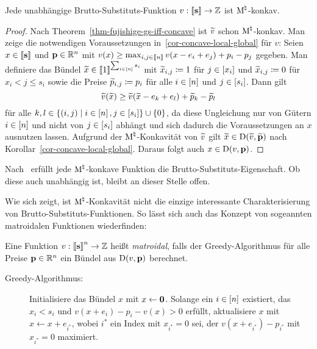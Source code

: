 \begin{korollar}\label{cor-indep-gs-m-concave}
	Jede unabhängige Brutto-Substituts-Funktion $v:\left\llbracket \mathbf{s} \right\rrbracket \rightarrow \mathbb{Z}$ ist $\textrm{\textup{M}}^\natural$-konkav.
\end{korollar}
\begin{proof}
	Nach Theorem~\ref{thm-fujishige-gs-iff-concave} ist $\widetilde{v}$ schon $\textrm{\textup{M}}^\natural$-konkav.
	Man zeige die notwendigen Voraussetzungen in~\ref{cor-concave-local-global} für $v$:
	Seien $x\in\left\llbracket \mathbf{s} \right\rrbracket$ und $\mathbf{p}\in\mathbb{R}^n$ mit $v(x)\geq \max_{i,j\in\left\llbracket n \right\rrbracket} v(x - e_i + e_j) + p_i - p_j$ gegeben.
	Man definiere das Bündel $\widetilde{x}\in\left\llbracket 1 \right\rrbracket^{\sum_{i\in\left[ n \right]} s_i}$ mit $\widetilde{x}_{i,j} \coloneqq 1$ für $j\in\left[ x_i \right]$ und $\widetilde{x}_{i,j} \coloneqq 0$ für $x_i < j \leq s_i$ sowie die Preise $\widetilde{p}_{i,j}\coloneqq p_i$ für alle $i\in\left[ n \right]$ und $j\in\left[ s_i \right]$.
	Dann
	gilt \[
	\widetilde{v}(\widetilde{x}) \geq \widetilde{v}(\widetilde{x} - e_k + e_l) + \widetilde{p}_k - \widetilde{p}_l
	\] für alle $k, l \in \{ (i,j) \mid i\in\left[ n \right], j\in\left[ s_i \right] \}\cup\{ 0 \}$, da diese Ungleichung nur von Gütern $i\in\left[ n \right]$ und nicht von $j\in\left[ s_i \right]$ abhängt und sich dadurch die Voraussetzungen an $x$ ausnutzen lassen.
	Aufgrund der $\textrm{\textup{M}}^\natural$-Konkavität von $\widetilde{v}$ gilt $\widetilde{x}\in\operatorname{D}(\widetilde{v}, \widetilde{\mathbf{p}})$ nach Korollar~\ref{cor-concave-local-global}. Daraus folgt auch $x\in\operatorname{D}(v,\mathbf{p})$.
\end{proof}
\begin{bemerkung}
	Nach~\cite[Theorem~11.4]{Murota2003} erfüllt jede $\textrm{\textup{M}}^\natural$-konkave Funktion die Brutto-Substituts-Eigenschaft.
	Ob diese auch unabhängig ist, bleibt an dieser Stelle offen.
\end{bemerkung}

Wie sich zeigt, ist $\textrm{\textup{M}}^\natural$-Konkavität nicht die einzige interessante Charakterisierung von Brutto-Substituts-Funktionen.
So lässt sich auch das Konzept von sogeannten matroidalen Funktionen wiederfinden:
\begin{definition}
	Eine Funktion $v:\left\llbracket \mathbf{s} \right\rrbracket^n\rightarrow \mathbb{Z}$ heißt \emph{matroidal}, falls
	der Greedy-Algorithmus für alle Preise $\mathbf{p}\in\mathbb{R}^n$ ein Bündel aus $\operatorname{D}(v, \mathbf{p})$ berechnet.
	\begin{description}
		\item[Greedy-Algorithmus:] Initialisiere das Bündel $x$ mit $x\leftarrow \mathbf{0}$.
		Solange ein $i\in\left[ n \right]$ existiert, das $x_i < s_i$ und $v(x + e_i) - p_i - v(x) > 0$ erfüllt,
		aktualisiere $x$ mit $x\leftarrow x + e_{i^*}$, wobei $i^*$ ein Index mit $x_{i^*}=0$ sei, der $v(x + e_{i^*}) - p_{i^*}$ mit $x_{i^*} = 0$ maximiert.
	\end{description}
\end{definition}

